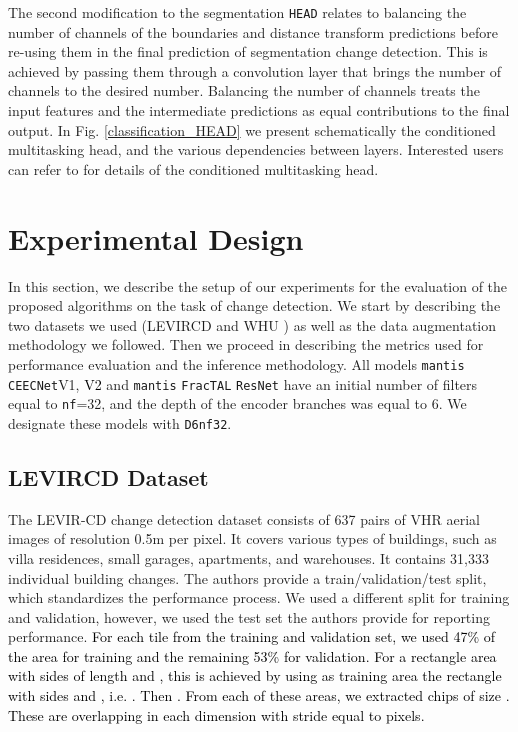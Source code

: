 \documentclass[times, 5p]{elsarticle}
\def \FracTAL {\texttt{FracTAL} }
\newcommand{\ceecnet}{\texttt{CEECNet}}
\newcommand{\mantis}{\texttt{mantis}}
\begin{document}
 
The second modification to the segmentation \texttt{HEAD} relates to balancing the number of channels of the boundaries and distance transform predictions before re-using them in the final prediction of segmentation change detection. This is achieved by passing them through a convolution layer that brings the number of channels to the desired number. Balancing the number of channels treats the input features and the intermediate predictions as equal contributions to the final output. 
In Fig. \ref{classification_HEAD} we present schematically the conditioned multitasking head, and the various dependencies between layers. Interested users can refer to \cite{DIAKOGIANNIS202094} for details of the conditioned multitasking head.  





\section{Experimental Design}
\label{section_experimental_design}

In this section, we describe the setup of our experiments for the evaluation of the proposed algorithms on the task of change detection.  
We start by describing the two datasets we used (LEVIRCD \citealt{rs12101662} and WHU \citealt{Ji2019FullyCN}) as well as the data augmentation methodology we followed. Then we proceed in describing  the metrics used for performance evaluation and the inference methodology. All models \mantis{} \ceecnet V1, \textcolor{black}{V2} and \mantis{} \FracTAL{} \texttt{ResNet} have an initial number of filters equal to \texttt{nf}=32, and the depth of the encoder branches was equal to 6. We designate these models with \texttt{D6nf32}. 

\subsection{LEVIRCD Dataset}

The LEVIR-CD change detection dataset \citep{rs12101662} consists of 637 pairs of  VHR aerial images of resolution 0.5m per pixel. It covers various types of buildings, such as villa residences, small garages, apartments, and warehouses. It contains 31,333 individual building changes. 
The authors provide a train/validation/test split, which standardizes the performance process. We used a different split for training and validation, however, we used the test set the authors provide for reporting performance.  
\textcolor{black}{ For each tile from the training and validation set, we used 47\% of the area  for training and the remaining 53\% for validation.
For a rectangle area with sides of length  and , this is achieved by using as training area the rectangle with sides  and , i.e.  . Then .  
 From each of these areas, we extracted chips of size . These are overlapping in each dimension with stride equal to  pixels. }
\end{document}
